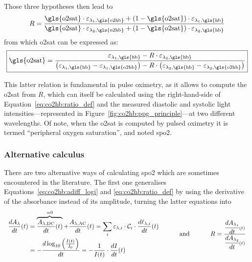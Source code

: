 Those three hypotheses then lead to
\begin{equation}\label{eq:co2hb:rr_defsao2}
	R= \frac{\text{\gls{o2sat}} \cdot \varepsilon_{\lambda_1,\text{\gls{o2hb}}} + (1-\text{\gls{o2sat}})\cdot \varepsilon_{\lambda_1,\text{\gls{hb}}}}{\text{\gls{o2sat}} \cdot \varepsilon_{\lambda_2,\text{\gls{o2hb}}} + (1-\text{\gls{o2sat}})\cdot \varepsilon_{\lambda_2,\text{\gls{hb}}}}
\end{equation}
from which \gls{o2sat} can be expressed as:
\begin{equation}\label{eq:co2hb:spo2_formulae}
	\boxed{
	\text{\gls{o2sat}} = \frac{\varepsilon_{\lambda_1,\text{\gls{hb}}} - R \cdot \varepsilon_{\lambda_2,\text{\gls{hb}}}}{\left(\varepsilon_{\lambda_1,\text{\gls{hb}}} - \varepsilon_{\lambda_1,\text{\gls{o2hb}}}\right) - R \cdot \left(\varepsilon_{\lambda_2,\text{\gls{hb}}} - \varepsilon_{\lambda_2,\text{\gls{o2hb}}}\right)}
	}
\end{equation}

This latter relation is fundamental in pulse oximetry, as it allows to compute the \gls{o2sat} from $R$, which can itself be calculated using the right-hand-side of Equation~\ref{eq:co2hb:ratio_def} and the measured diastolic and systolic light intensities---represented in Figure~\ref{fig:co2hb:ppg_principle}---at two different wavelengths. Of note, when the \gls{o2sat} is computed by pulsed oximetry it is termed \enquote{peripheral oxygen saturation}, and noted \gls{spo2}.

\subsubsection{Alternative calculus}

There are two alternative ways of calculating \gls{spo2} which are sometimes encountered in the literature. The first one generalises Equations~\ref{eq:co2hb:adiff_logi} and \ref{eq:co2hb:ratio_def} by using the derivative of the absorbance instead of its amplitude, \ie{} turning the latter equations into
\begin{equation}
	\begin{tabular}{ccc}
		$
		\begin{aligned}
			\frac{dA_\lambda}{dt}(t) &= \overbrace{\frac{A_{\lambda,\text{DC}}}{dt}(t)}^{=0} + \frac{A_{\lambda,\text{AC}}}{dt}(t) = \sum_{i} \varepsilon_{\lambda, i} \cdot \mathcal{C}_i \cdot \frac{d\ell_{\lambda, i}}{dt}(t)\\
			&= -\frac{d\log_{10}\left(\frac{I(t)}{I_0}\right)}{dt} = -\frac{1}{I(t)}\cdot \frac{dI}{dt}(t)
		\end{aligned}
		$ & \hspace{0.6cm} and \hspace{0.6cm} & $
		R = \frac{\cfrac{dA_{\lambda_1}}{dt}(t)}{ \cfrac{dA_{\lambda_2}}{dt}(t)}
		$
	\end{tabular}
\end{equation}

